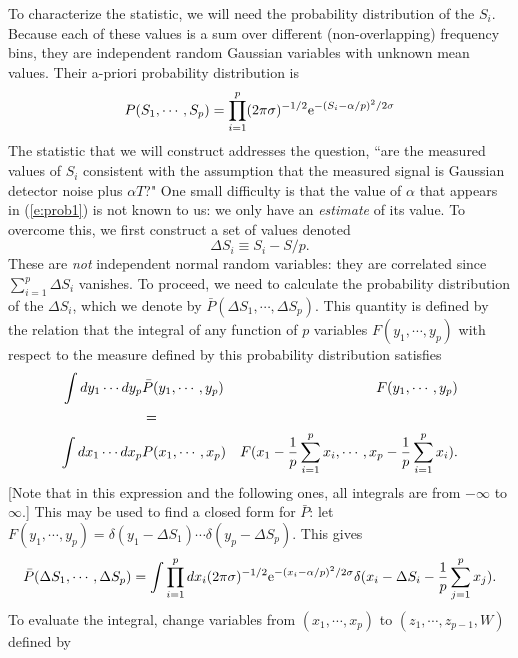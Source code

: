 To characterize the statistic, we will need the probability distribution
of the $S_i$.  Because each of these values is a sum over different
(non-overlapping) frequency bins, they are independent random Gaussian
variables with unknown mean values.  Their a-priori probability
distribution is
\begin{equation}
\label{e:prob1}
P(S_1,\cdots,S_p) = \prod_{i=1}^p (2 \pi \sigma)^{-1/2} 
{\rm e}^{- { \left(S_i - \alpha /p \right )^2 / 2 \sigma}}
\end{equation}
The statistic that we will construct addresses the question, ``are
the measured values of $S_i$ consistent with the assumption that the
measured signal is Gaussian detector noise plus $\alpha T$?"  One small
difficulty is that the value of $\alpha$ that appears in (\ref{e:prob1})
is not known to us: we only have an {\it estimate} of its value.
To overcome this, we first construct a set of values denoted
\begin{equation}
\Delta S_i \equiv S_i-S/p.
\end{equation}
These are {\it not} independent normal random variables: they are
correlated since $\sum_{i=1}^p \Delta S_i$ vanishes.  To proceed, we need
to calculate the probability distribution of the $\Delta S_i$, which
we denote by $\bar P(\Delta S_1,\cdots,\Delta S_p)$.  This quantity
is defined by the relation that the integral of any function of $p$
variables $F(y_1,\cdots,y_p)$ with respect to the measure defined by
this probability distribution satisfies
\begin{eqnarray}
\nonumber
 \int  dy_1 \cdots dy_p & \bar P (y_1,\cdots,y_p) & F(y_1,\cdots,y_p) \\
\nonumber
 & = & \\
\label{e:defpbar}
 \int dx_1 \cdots dx_p   &   P (x_1,\cdots,x_p) & F(x_1 - {1 \over p}
 \sum_{i=1}^p x_i,\cdots,x_p - {1 \over p} \sum_{i=1}^p x_i ).
\end{eqnarray}
[Note that in this expression and the following ones, all integrals are from
$-\infty$ to $\infty$.]
This may be used to find a closed form for $\bar P$: let
$F(y_1,\cdots,y_p) = \delta(y_1 - \Delta S_1) \cdots \delta(y_p -
\Delta S_p)$.  This gives
\begin{equation}
\bar P (\Delta S_1,\cdots,\Delta S_p) = \int  \prod_{i=1}^pdx_i (2 \pi
\sigma)^{-1/2} {\rm e}^{-(x_i - \alpha/p)^2 / 2 \sigma} \delta(x_i -
\Delta S_i - {1 \over p} \sum_{j=1}^p x_j ).
\end{equation}
To evaluate the integral, change variables from $(x_1,\cdots,x_p)$ to
$(z_1,\cdots,z_{p-1},W)$ defined by

